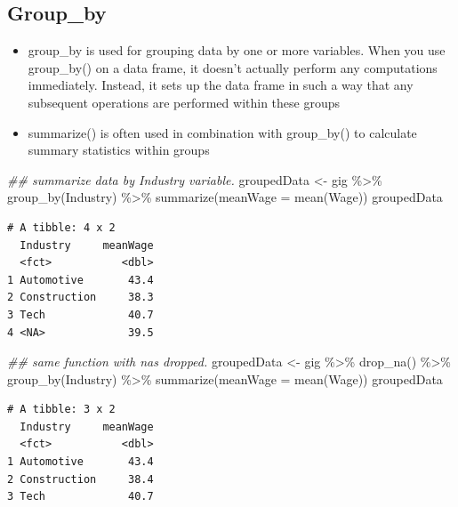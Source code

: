 \documentclass[
  letterpaper,
  DIV=11,
  numbers=noendperiod]{scrreprt}
\newenvironment{Shaded}{\begin{snugshade}}{\end{snugshade}}
\newcommand{\AttributeTok}[1]{\textcolor[rgb]{0.40,0.45,0.13}{#1}}
\newcommand{\DocumentationTok}[1]{\textcolor[rgb]{0.37,0.37,0.37}{\textit{#1}}}
\newcommand{\FunctionTok}[1]{\textcolor[rgb]{0.28,0.35,0.67}{#1}}
\newcommand{\NormalTok}[1]{\textcolor[rgb]{0.00,0.23,0.31}{#1}}
\newcommand{\OtherTok}[1]{\textcolor[rgb]{0.00,0.23,0.31}{#1}}
\newcommand{\SpecialCharTok}[1]{\textcolor[rgb]{0.37,0.37,0.37}{#1}}
\providecommand{\tightlist}{%
  \setlength{\itemsep}{0pt}\setlength{\parskip}{0pt}}\usepackage{longtable,booktabs,array}
\begin{document}
\subsection{Group\_by}\label{group_by}

\begin{itemize}
\tightlist
\item
  group\_by is used for grouping data by one or more variables. When you
  use group\_by() on a data frame, it doesn't actually perform any
  computations immediately. Instead, it sets up the data frame in such a
  way that any subsequent operations are performed within these groups
\item
  summarize() is often used in combination with group\_by() to calculate
  summary statistics within groups
\end{itemize}

\begin{Shaded}
\begin{Highlighting}[]
\DocumentationTok{\#\# summarize data by Industry variable.}
\NormalTok{groupedData }\OtherTok{\textless{}{-}}\NormalTok{ gig }\SpecialCharTok{\%\textgreater{}\%}
    \FunctionTok{group\_by}\NormalTok{(Industry) }\SpecialCharTok{\%\textgreater{}\%}
    \FunctionTok{summarize}\NormalTok{(}\AttributeTok{meanWage =} \FunctionTok{mean}\NormalTok{(Wage))}
\NormalTok{groupedData}
\end{Highlighting}
\end{Shaded}

\begin{verbatim}
# A tibble: 4 x 2
  Industry     meanWage
  <fct>           <dbl>
1 Automotive       43.4
2 Construction     38.3
3 Tech             40.7
4 <NA>             39.5
\end{verbatim}

\begin{Shaded}
\begin{Highlighting}[]
\DocumentationTok{\#\# same function with na\textquotesingle{}s dropped.}
\NormalTok{groupedData }\OtherTok{\textless{}{-}}\NormalTok{ gig }\SpecialCharTok{\%\textgreater{}\%}
    \FunctionTok{drop\_na}\NormalTok{() }\SpecialCharTok{\%\textgreater{}\%}
    \FunctionTok{group\_by}\NormalTok{(Industry) }\SpecialCharTok{\%\textgreater{}\%}
    \FunctionTok{summarize}\NormalTok{(}\AttributeTok{meanWage =} \FunctionTok{mean}\NormalTok{(Wage))}
\NormalTok{groupedData}
\end{Highlighting}
\end{Shaded}

\begin{verbatim}
# A tibble: 3 x 2
  Industry     meanWage
  <fct>           <dbl>
1 Automotive       43.4
2 Construction     38.4
3 Tech             40.7
\end{verbatim}
\end{document}
